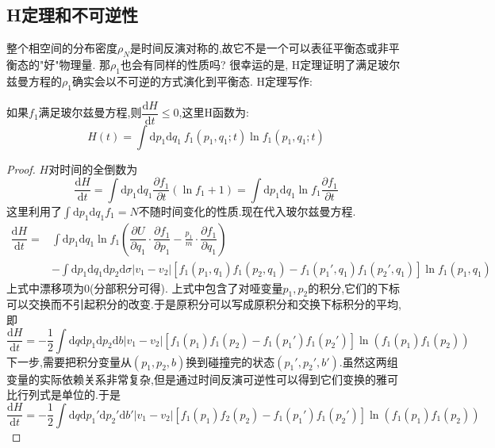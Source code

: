 \subsection{H定理和不可逆性}
    整个相空间的分布密度$\rho_{N}$是时间反演对称的,故它不是一个可以表征平衡态或非平衡态的"好"物理量. 那$\rho_1$也会有同样的性质吗? 很幸运的是, H定理证明了满足玻尔兹曼方程的$\rho_1$确实会以不可逆的方式演化到平衡态.
    H定理写作:
    \begin{theorem}
      如果$f_1$满足玻尔兹曼方程,则$\dfrac{\mathrm{d}H}{\mathrm{d} t}\le 0$,这里H函数为:
      \begin{equation}
        H(t)=\int \mathrm{d} p_1 \mathrm{d} q_1 ~f_{1}(p_1,q_1;t)\ln f_1(p_1,q_1;t)
        \label{eq:6.17}
      \end{equation}
    \end{theorem}
    \begin{proof}
      $H$对时间的全倒数为
      \[\dfrac{\mathrm{d}H}{\mathrm{d} t}=\int \mathrm{d} p_1 \mathrm{d} q_1 \dfrac{\partial f_1}{\partial t}(\ln f_1 +1)=\int \mathrm{d} p_1 \mathrm{d} q_1 \ln f_1 \dfrac{\partial f_1}{\partial t}\]
      这里利用了$\int \mathrm{d} p_1 \mathrm{d} q_1 f_1=N$不随时间变化的性质.现在代入玻尔兹曼方程.
      \begin{align*}
        \dfrac{\mathrm{d}H}{\mathrm{d} t}=&\int \mathrm{d} p_1 \mathrm{d} q_1 \ln f_1 \left( \dfrac{\partial U}{\partial q_1}\cdot \dfrac{\partial f_1}{\partial p_1}-\frac{p_1}{m}\cdot \dfrac{\partial f_1}{\partial q_1} \right) \\
        &-\int \mathrm{d} p_1 \mathrm{d} q_1 \mathrm{d} p_2 \mathrm{d} \sigma \left\vert v_1-v_2 \right\vert \left[ f_1(p_1,q_1)f_1(p_2,q_1)-f_1(p_1',q_1)f_1(p_2',q_1) \right] \ln f_1 (p_1,q_1)
      \end{align*}
      上式中漂移项为0(分部积分可得). 上式中包含了对哑变量$p_1,p_2$的积分,它们的下标可以交换而不引起积分的改变.于是原积分可以写成原积分和交换下标积分的平均,即 
      \[\dfrac{\mathrm{d}H}{\mathrm{d} t}=-\frac{1}{2}\int \mathrm{d} q \mathrm{d} p_1 \mathrm{d} p_2 \mathrm{d} b \left\vert v_1-v_2 \right\vert \left[ f_1(p_1)f_1(p_2)-f_1(p_1')f_1(p_2') \right]\ln\left( f_1(p_1)f_1(p_2) \right) \]
      下一步,需要把积分变量从$(p_1,p_2,b)$换到碰撞完的状态$(p_1',p_2',b')$.虽然这两组变量的实际依赖关系非常复杂,但是通过时间反演可逆性可以得到它们变换的雅可比行列式是单位的.于是 
      \[\dfrac{\mathrm{d}H}{\mathrm{d} t}=-\frac{1}{2}\int \mathrm{d} q \mathrm{d} p_1' \mathrm{d}  p_2' \mathrm{d} b' \left\vert v_1- v_2 \right\vert \left[ f_1(p_1)f_2(p_2)-f_1(p_1')f_1(p_2') \right] \ln(f_1(p_1)f_1(p_2)) \]

\end{proof}
